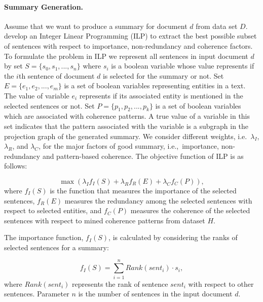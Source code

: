 \paragraph{Summary Generation.}
Assume that we want to produce a summary for document $d$ from data set $D$. 
 develop an Integer Linear Programming (ILP) to extract the best possible subset of sentences with respect to importance, non-redundancy and coherence factors. 
To formulate the problem in ILP we represent all sentences in input document $d$ by set $S = \lbrace s_0,s_1,...,s_n \rbrace$ where $s_i$ is a boolean variable whose value represents if the $i$th sentence of document $d$ is selected for the summary or not.  
Set $E=\lbrace e_1, e_2,...,e_m \rbrace$ is a set of boolean variables representing entities in a text. 
The value of variable $e_i$ represents if its associated entity is mentioned in the selected sentences or not. 
Set $P= \lbrace p_1,p_2,..., p_k \rbrace$ is a set of boolean variables which are associated with coherence patterns. 
A true value of a variable in this set indicates that the pattern associated with the variable is a subgraph in the projection graph of the generated summary. 
We consider different weights, i.e.\ $\lambda_I$, $\lambda_R$, and $\lambda_C$, for the major factors of good summary, i.e.,\ importance, non-redundancy and pattern-based coherence.  
The objective function of ILP is as follows:

\begin{equation}
\max(\lambda_I f_I(S) + \lambda_R f_R(E) + \lambda_C f_C(P )),
\end{equation}
where $f_I(S)$ is the function that measures the importance of the selected sentences, $f_R(E)$ measures the redundancy among the selected sentences with respect to selected entities, and $f_C(P)$ measures the coherence of the selected sentences with respect to mined coherence patterns from dataset $H$. 

The importance function, $f_I(S)$, is calculated by considering the ranks of selected sentences for a summary:

\begin{equation}
f_I(S) = \sum_{i=1}^{n}{Rank(sent_i) \cdot s_i},
\end{equation}
%
where $Rank(sent_i)$ represents the rank of sentence $sent_i$ with respect to other sentences. 
Parameter $n$ is the number of sentences in the input document $d$.  

